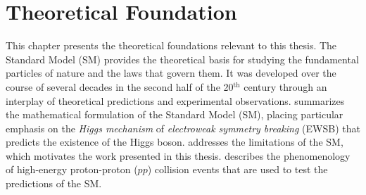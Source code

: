 \chapter{Theoretical Foundation}
\label{chap:theory}
This chapter presents the theoretical foundations relevant to this thesis.  
The Standard Model (SM) provides the theoretical basis for studying the fundamental particles of nature and the laws that govern them. It was developed over the course of several decades in the second half of the 20$^{\text{th}}$ century through an interplay of theoretical predictions and experimental observations.
 summarizes the mathematical formulation of the Standard Model (SM), placing particular emphasis on the \emph{Higgs mechanism} of \emph{electroweak symmetry breaking} (EWSB) that predicts the existence of the Higgs boson.
 addresses the limitations of the SM, which motivates the work presented in this thesis. 
 describes the phenomenology of high-energy proton-proton ($pp$) collision events that are used to test the predictions of the SM.



